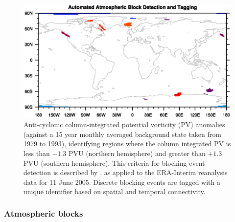\documentclass[11pt]{article}
\begin{document}
\begin{figure}[p]
\begin{center}
\includegraphics[trim=0.5cm 4.5cm 1cm 4.5cm, clip=true, width=5in]{blob_plot}
\end{center}
\caption{Anti-cyclonic column-integrated potential vorticity (PV) anomalies (against a 15 year monthly averaged background state taken from 1979 to 1993), identifying regions where the column integrated PV is less than $-1.3$ PVU (northern hemisphere) and greater than $+1.3$ PVU (southern hemisphere).  This criteria for blocking event detection is described by \cite{scherrer2006two}, as applied to the ERA-Interim reanalysis data for 11 June 2005.  Discrete blocking events are tagged with a unique identifier based on spatial and temporal connectivity.} \label{fig:BlockingDetection}
\end{figure}

\subsubsection{Atmospheric blocks}
\end{document}
